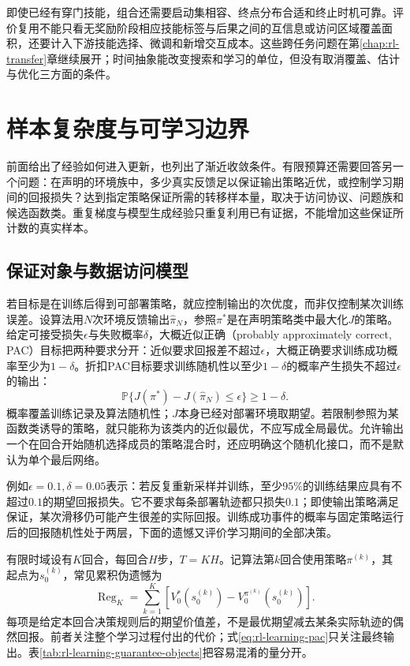 即使已经有穿门技能，组合还需要启动集相容、终点分布合适和终止时机可靠。评价复用不能只看无奖励阶段相应技能标签与后果之间的互信息或访问区域覆盖面积，还要计入下游技能选择、微调和新增交互成本。这些跨任务问题在第\ref{chap:rl-transfer}章继续展开；时间抽象能改变搜索和学习的单位，但没有取消覆盖、估计与优化三方面的条件。

\section{样本复杂度与可学习边界}
\label{sec:rl-learning-statistical-limits}

前面给出了经验如何进入更新，也列出了渐近收敛条件。有限预算还需要回答另一个问题：在声明的环境族中，多少真实反馈足以保证输出策略近优，或控制学习期间的回报损失？达到指定策略保证所需的转移样本量，取决于访问协议、问题族和候选函数类。重复梯度与模型生成经验只重复利用已有证据，不能增加这些保证所计数的真实样本。

\subsection{保证对象与数据访问模型}
\label{sec:rl-learning-guarantees-access}

若目标是在训练后得到可部署策略，就应控制输出的次优度，而非仅控制某次训练误差。设算法用$N$次环境反馈输出$\widehat\pi_N$，参照$\pi^*$是在声明策略类中最大化$J$的策略。给定可接受损失$\epsilon$与失败概率$\delta$，大概近似正确（probably approximately correct, PAC）目标把两种要求分开：近似要求回报差不超过$\epsilon$，大概正确要求训练成功概率至少为$1-\delta$。折扣PAC目标要求训练随机性以至少$1-\delta$的概率产生损失不超过$\epsilon$的输出：
\begin{equation}
 \mathbb P\{J(\pi^*)-J(\widehat\pi_N)\leq\epsilon\}
                       \geq1-\delta.
 \label{eq:rl-learning-pac}
\end{equation}
概率覆盖训练记录及算法随机性；$J$本身已经对部署环境取期望。若限制参照为某函数类诱导的策略，就只能称为该类内的近似最优，不应写成全局最优。允许输出一个在回合开始随机选择成员的策略混合时，还应明确这个随机化接口，而不是默认为单个最后网络。

例如$\epsilon=0.1,\delta=0.05$表示：若反复重新采样并训练，至少$95\%$的训练结果应具有不超过$0.1$的期望回报损失。它不要求每条部署轨迹都只损失$0.1$；即使输出策略满足保证，某次滑移仍可能产生很差的实际回报。训练成功事件的概率与固定策略运行后的回报随机性处于两层，下面的遗憾又评价学习期间的全部决策。

有限时域设有$K$回合，每回合$H$步，$T=KH$。记算法第$k$回合使用策略$\pi^{(k)}$，其起点为$s_0^{(k)}$，常见累积伪遗憾为
\begin{equation}
 \operatorname{Reg}_K
   =\sum_{k=1}^{K}\left[
       V_0^*(s_0^{(k)})-V_0^{\pi^{(k)}}(s_0^{(k)})\right].
 \label{eq:rl-learning-episodic-regret}
\end{equation}
每项是给定本回合决策规则后的期望价值差，不是最优期望减去某条实际轨迹的偶然回报。前者关注整个学习过程付出的代价；式\eqref{eq:rl-learning-pac}只关注最终输出。表\ref{tab:rl-learning-guarantee-objects}把容易混淆的量分开。

